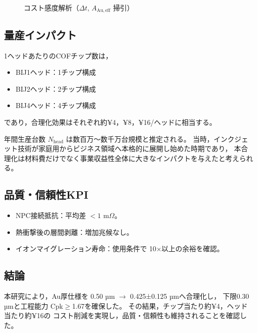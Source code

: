\documentclass[conference]{IEEEtran}
\begin{document}
\begin{figure}[htbp]
  \centering
  \caption{コスト感度解析（$\Delta t$, $A_{\mathrm{Au,eff}}$ 掃引）}
  \label{fig:cost-sense}
\end{figure}

\subsection{量産インパクト}
1ヘッドあたりのCOFチップ数は，  
\begin{itemize}
  \item BIJ1ヘッド：1チップ構成  
  \item BIJ2ヘッド：2チップ構成  
  \item BIJ4ヘッド：4チップ構成  
\end{itemize}
であり，合理化効果はそれぞれ約¥4，¥8，¥16/ヘッドに相当する。  

年間生産台数 $N_{\mathrm{head}}$ は数百万〜数千万台規模と推定される。  
当時，インクジェット技術が家庭用からビジネス領域へ本格的に展開し始めた時期であり，  
本合理化は材料費だけでなく事業収益性全体に大きなインパクトを与えたと考えられる。

\subsection{品質・信頼性KPI}
\begin{itemize}
  \item NPC接続抵抗：平均差 $<1$ m$\Omega$。
  \item 熱衝撃後の層間剥離：増加兆候なし。
  \item イオンマイグレーション寿命：使用条件で 10$\times$以上の余裕を確認。
\end{itemize}

\subsection{結論}
本研究により，Au厚仕様を
0.50 µm $\rightarrow$ 0.425±0.125 µmへ合理化し，
下限0.30 µmと工程能力 Cpk$\geq$1.67を確保した。  
その結果，チップ当たり約¥4，ヘッド当たり約¥16の
コスト削減を実現し，品質・信頼性も維持されることを確認した。  
\end{document}
